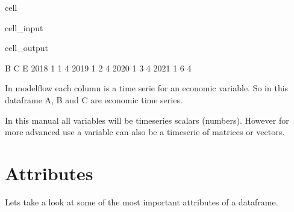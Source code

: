 \documentclass[letterpaper,10pt,english]{jupyterBook}
\begin{document}
\begin{sphinxuseclass}{cell}\begin{sphinxVerbatimInput}

\begin{sphinxuseclass}{cell_input}
\begin{sphinxVerbatim}[commandchars=\\\{\}]
   \PYG{p}{[}\PYG{p}{]}\PYG{p}{[}\PYG{p}{]}\PYG{p}{[}\PYG{p}{]}\PYG{p}{[}\PYG{p}{]}
\end{sphinxVerbatim}

\end{sphinxuseclass}\end{sphinxVerbatimInput}
\begin{sphinxVerbatimOutput}

\begin{sphinxuseclass}{cell_output}
\begin{sphinxVerbatim}[commandchars=\\\{\}]
      B  C  E
2018  1  1  4
2019  1  2  4
2020  1  3  4
2021  1  6  4
\end{sphinxVerbatim}

\end{sphinxuseclass}\end{sphinxVerbatimOutput}

\end{sphinxuseclass}
\sphinxAtStartPar
In modelflow each column is a  time serie for an economic variable. So in this dataframe A, B and C are economic time series.

\sphinxAtStartPar
In this manual all variables will be timeseries scalars (numbers). 
However for more advanced use a variable can also be a timeserie of matrices or vectors.


\section{Attributes}
\label{\detokenize{content/notebooks/pandas/dataframes:attributes}}
\sphinxAtStartPar
Lets take a look at some of the most important attributes of a dataframe.
\end{document}
